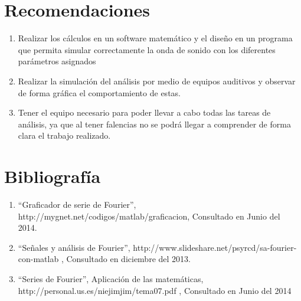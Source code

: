 \documentclass[10pt,a4paper]{book}
\begin{document}
\section{Recomendaciones}

\begin{enumerate}
\item Realizar los cálculos en un software matemático y el diseño en un programa que permita simular correctamente la onda de sonido con los diferentes parámetros asignados
\item Realizar la simulación del análisis por medio de equipos auditivos y observar de forma gráfica el comportamiento de estas.
\item Tener el equipo necesario para poder llevar a cabo todas las tareas de análisis, ya que al tener falencias no se podrá llegar a comprender de forma clara el trabajo realizado.

\end{enumerate}

\section{Bibliografía}

\begin{enumerate}
\item “Graficador de serie de Fourier”, http://mygnet.net/codigos/matlab/graficacion, Consultado en Junio del 2014.
\item “Señales y análisis de Fourier”, http://www.slideshare.net/psyrcd/sa-fourier-con-matlab , Consultado en diciembre del 2013.
\item “Series de Fourier”, Aplicación de las matemáticas, http://personal.us.es/niejimjim/tema07.pdf , Consultado en Junio del 2014
\end{enumerate}
\end{document}
